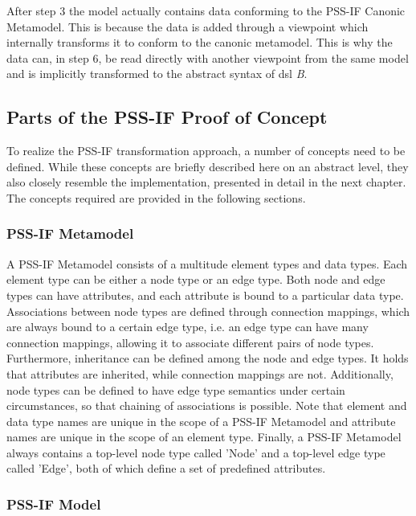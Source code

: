 After step 3 the model actually contains data conforming to the PSS-IF Canonic Metamodel. This is because the data is added through a viewpoint which internally transforms it to conform to the canonic metamodel. This is why the data can, in step 6, be read directly with another viewpoint from the same model and is implicitly transformed to the abstract syntax of \gls{dsl} \textit{B}.

\subsection{Parts of the PSS-IF Proof of Concept}

To realize the PSS-IF transformation approach, a number of concepts need to be defined. While these concepts are briefly described here on an abstract level, they also closely resemble the implementation, presented in detail in the next chapter. The concepts required are provided in the following sections.

\subsubsection{PSS-IF Metamodel}

A PSS-IF Metamodel consists of a multitude element types and data types. Each element type can be either a node type or an edge type. Both node and edge types can have attributes, and each attribute is bound to a particular data type. Associations between node types are defined through connection mappings, which are always bound to a certain edge type, i.e. an edge type can have many connection mappings, allowing it to associate different pairs of node types. Furthermore, inheritance can be defined among the node and edge types. It holds that attributes are inherited, while connection mappings are not. Additionally, node types can be defined to have edge type semantics under certain circumstances, so that chaining of associations is possible. Note that element and data type names are unique in the scope of a PSS-IF Metamodel and attribute names are unique in the scope of an element type. Finally, a PSS-IF Metamodel always contains a top-level node type called 'Node' and a top-level edge type called 'Edge', both of which define a set of predefined attributes.

\subsubsection{PSS-IF Model}

